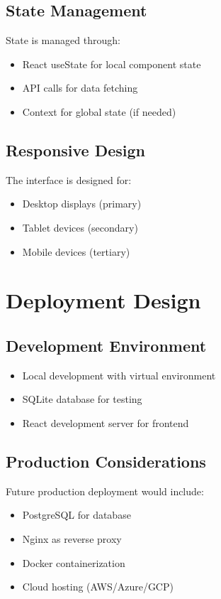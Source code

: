 \subsection{State Management}

State is managed through:

\begin{itemize}
    \item React useState for local component state
    \item API calls for data fetching
    \item Context for global state (if needed)
\end{itemize}

\subsection{Responsive Design}

The interface is designed for:

\begin{itemize}
    \item Desktop displays (primary)
    \item Tablet devices (secondary)
    \item Mobile devices (tertiary)
\end{itemize}

\section{Deployment Design}

\subsection{Development Environment}

\begin{itemize}
    \item Local development with virtual environment
    \item SQLite database for testing
    \item React development server for frontend
\end{itemize}

\subsection{Production Considerations}

Future production deployment would include:

\begin{itemize}
    \item PostgreSQL for database
    \item Nginx as reverse proxy
    \item Docker containerization
    \item Cloud hosting (AWS/Azure/GCP)
\end{itemize}


